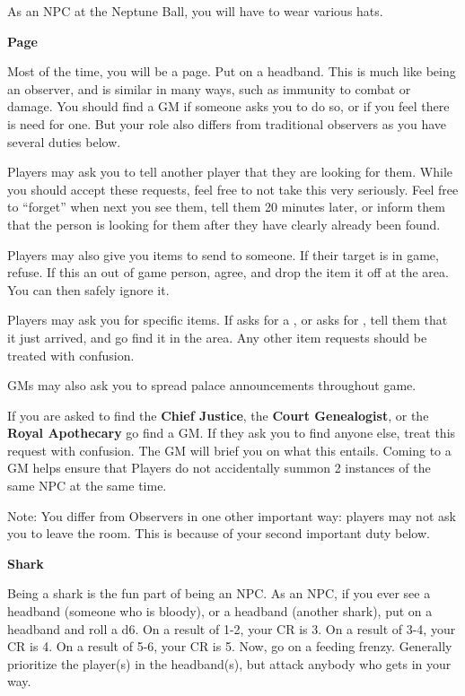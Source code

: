\documentclass[green]{NeptuneBall}
\begin{document}
\name{\gNPC{}}

As an NPC at the Neptune Ball, you will have to wear various hats.

{\bf Page}

Most of the time, you will be a page. Put on a  headband. This is much like being an observer, and is similar in many ways, such as immunity to combat or damage. You should find a GM if someone asks you to do so, or if you feel there is need for one. But your role also differs from traditional observers as you have several duties below.

Players may ask you to tell another player that they are looking for them. While you should accept these requests, feel free to not take this very seriously. Feel free to ``forget'' when next you see them, tell them 20 minutes later, or inform them that the person is looking for them after they have clearly already been found. 

Players may also give you items to send to someone. If their target is in game, refuse. If this an out of game person, agree, and drop the item it off at the \pGM{} area. You can then safely ignore it.

Players may ask you for specific items. If \cPriest{} asks for a \iBaby{}, or \cSpy{} asks for \iScroll{}, tell them that it just arrived, and go find it in the \pGM{} area. Any other item requests should be treated with confusion.

GMs may also ask you to spread palace announcements throughout game.

If you are asked to find the \textbf{Chief Justice}, the \textbf{Court Genealogist}, or the \textbf{Royal Apothecary} go find a GM. If they ask you to find anyone else, treat this request with confusion. The GM will brief you on what this entails. Coming to a GM helps ensure that Players do not accidentally summon 2 instances of the same NPC at the same time.

Note: You differ from Observers in one other important way: players may not ask you to leave the room. This is because of your second important duty below.

{\bf Shark}

Being a shark is the fun part of being an NPC. As an NPC, if you ever see a  headband (someone who is bloody), or a  headband (another shark), put on a  headband and roll a d6. On a result of 1-2, your CR is 3. On a result of 3-4, your CR is 4. On a result of 5-6, your CR is 5. Now, go on a feeding frenzy. Generally prioritize the player(s) in the  headband(s), but attack anybody who gets in your way. 
\end{document}
